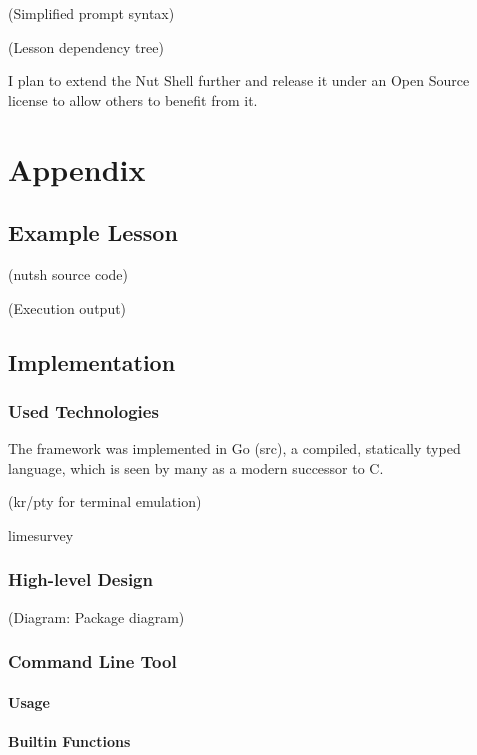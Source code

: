 \documentclass[a4paper,twoside,abstract=on,cleardoublepage=empty,numbers=noenddot,toc=bib]{scrreprt}
\begin{document}
    (Simplified prompt syntax)

    (Lesson dependency tree)

I plan to extend the Nut Shell further and release it under an Open Source license to allow others to benefit from it.

\cleardoublepage
\part*{Appendix}
\appendix

\chapter{Example Lesson}

(nutsh source code)

(Execution output)

\chapter{Implementation}

\section{Used Technologies}

The framework was implemented in Go (src), a compiled, statically typed language, which is seen by many as a modern successor to C.

(kr/pty for terminal emulation)

    limesurvey

\section{High-level Design}

(Diagram: Package diagram)

\section{Command Line Tool}

\subsection{Usage}

\subsection{Builtin Functions}
\end{document}
